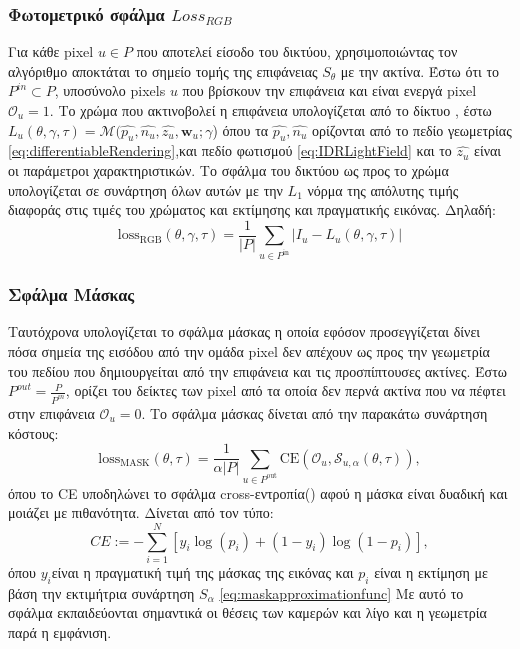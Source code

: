 \subsubsection{Φωτομετρικό σφάλμα $Loss_{RGB}$}
    Για κάθε pixel $u \in P$ που αποτελεί είσοδο του δικτύου, χρησιμοποιώντας τον αλγόριθμο  αποκτάται το σημείο τομής της επιφάνειας $S_\theta$ με την ακτίνα. Έστω ότι το  $P^{in} \subset P$, υποσύνολο pixels $u$ που βρίσκουν την επιφάνεια και είναι ενεργά pixel $\mathcal{O}_u = 1$. Το χρώμα που ακτινοβολεί η επιφάνεια υπολογίζεται από το δίκτυο , έστω $L_{u}(\theta,\gamma,\tau) = \mathcal{M}(\hat{p_u},\hat{n_u},\hat{z_u},\boldsymbol{w}_u;\gamma$) όπου τα $\hat{p_u},\hat{n_u}$ ορίζονται από το πεδίο γεωμετρίας \ref{eq:differentiableRendering},και πεδίο φωτισμού \ref{eq:IDRLightField} και το $\hat{z_u}$ είναι οι παράμετροι χαρακτηριστικών. Το σφάλμα του δικτύου ως προς το χρώμα υπολογίζεται σε συνάρτηση όλων αυτών με την $L_1$ νόρμα της απόλυτης τιμής διαφοράς στις τιμές του χρώματος και εκτίμησης και πραγματικής εικόνας. Δηλαδή:
    \begin{equation}
        \mathrm{loss}_{\mathrm{RGB}}(\theta,\gamma,\tau)=\frac{1}{|P|}\sum_{u\in P^{\mathrm{in}}}|I_{u}-L_{u}(\theta,\gamma,\tau)|
        \label{eq:IDRRGBLoss}
    \end{equation}
\subsubsection{Σφάλμα Μάσκας}
    Ταυτόχρονα υπολογίζεται το σφάλμα μάσκας η οποία εφόσον προσεγγίζεται δίνει πόσα σημεία της εισόδου από την ομάδα pixel δεν απέχουν ως προς την γεωμετρία του πεδίου που δημιουργείται από την επιφάνεια και τις προσπίπτουσες ακτίνες. Έστω $P^{out} = \frac{P}{P^{in}}$, ορίζει του δείκτες των pixel από τα οποία δεν περνά ακτίνα που να πέφτει στην επιφάνεια $\mathcal{O}_u = 0$. Το σφάλμα μάσκας δίνεται από την παρακάτω συνάρτηση κόστους:
    \begin{equation}
        \mathrm{loss}_{\text{MASK}}(\theta,\tau)=\frac{1}{\alpha|P|}\sum_{u\in P^{\text{out}}}\mathrm{CE}(\mathcal{O}_u,\mathcal{S}_{u,\alpha}(\theta,\tau)),
        \label{eq:IDRMaskLoss}
    \end{equation}
    όπου το CE υποδηλώνει το σφάλμα cross-εντροπία() αφού η μάσκα είναι δυαδική και μοιάζει με πιθανότητα. Δίνεται από τον τύπο:
    \[
        CE:= -\sum_{i=1}^{N} [y_i \log(p_i) + (1 - y_i) \log(1 - p_i)],
    \]
    όπου  \(y_i\)είναι η πραγματική τιμή της μάσκας της εικόνας και $p_{i}$ είναι η εκτίμηση με βάση την εκτιμήτρια συνάρτηση \(S_\alpha\) \ref{eq:maskapproximationfunc}
    Με αυτό το σφάλμα εκπαιδεύονται σημαντικά οι θέσεις των καμερών και λίγο και η γεωμετρία παρά η εμφάνιση.

